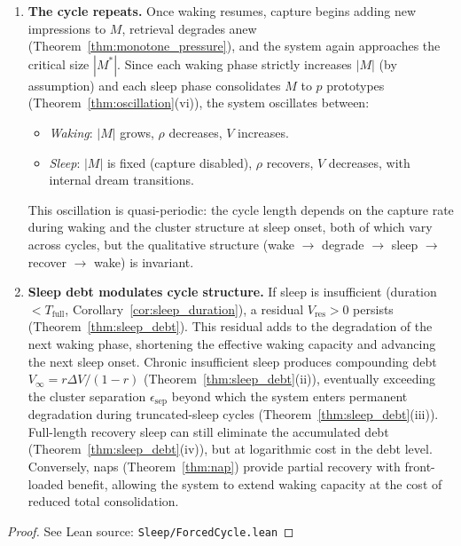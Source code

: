 \begin{corollary}
\begin{enumerate}
\item \textbf{The cycle repeats.}  Once waking resumes, capture begins
adding new impressions to $M$, retrieval degrades anew
(Theorem~\ref{thm:monotone_pressure}), and the system again approaches
the critical size $|M^*|$.  Since each waking phase strictly increases
$|M|$ (by assumption) and each sleep phase consolidates $M$ to $p$
prototypes (Theorem~\ref{thm:oscillation}(vi)), the system oscillates
between:
\begin{itemize}
\item \emph{Waking}: $|M|$ grows, $\rho$ decreases, $V$ increases.
\item \emph{Sleep}: $|M|$ is fixed (capture disabled), $\rho$ recovers,
$V$ decreases, with internal dream transitions.
\end{itemize}
This oscillation is quasi-periodic: the cycle length depends on the
capture rate during waking and the cluster structure at sleep onset, both
of which vary across cycles, but the qualitative structure
(wake $\to$ degrade $\to$ sleep $\to$ recover $\to$ wake) is invariant.

\item \textbf{Sleep debt modulates cycle structure.}  If sleep is
insufficient (duration $< T_{\mathrm{full}}$,
Corollary~\ref{cor:sleep_duration}), a residual $V_{\mathrm{res}} > 0$
persists (Theorem~\ref{thm:sleep_debt}).  This residual adds to the
degradation of the next waking phase, shortening the effective waking
capacity and advancing the next sleep onset.  Chronic insufficient
sleep produces compounding debt $V_\infty = r\Delta V / (1 - r)$
(Theorem~\ref{thm:sleep_debt}(ii)), eventually exceeding the
cluster separation $\epsilon_{\mathrm{sep}}$ beyond which the system
enters permanent degradation during truncated-sleep cycles
(Theorem~\ref{thm:sleep_debt}(iii)).  Full-length recovery sleep can
still eliminate the accumulated debt
(Theorem~\ref{thm:sleep_debt}(iv)), but at logarithmic cost in the
debt level.  Conversely, naps
(Theorem~\ref{thm:nap}) provide partial recovery with front-loaded
benefit, allowing the system to extend waking capacity at the cost of
reduced total consolidation.
\end{enumerate}
\end{corollary}

\begin{proof}
\leanok
{}
See Lean source: \texttt{Sleep/ForcedCycle.lean}
\end{proof}

